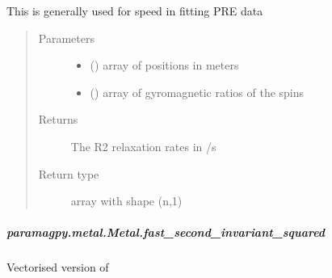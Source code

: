 \documentclass[a4paper,10pt,english,openany,oneside]{sphinxmanual}
\begin{document}
\begin{fulllineitems}
\begin{fulllineitems}
\begin{fulllineitems}
This is generally used for speed in fitting PRE data
\begin{quote}\begin{description}
\item[{Parameters}] \leavevmode\begin{itemize}
\item {} 
 (\sphinxstyleliteralemphasis{\sphinxupquote{ (}}\sphinxstyleliteralemphasis{\sphinxupquote{,}}\sphinxstyleliteralemphasis{\sphinxupquote{)}}) \textendash{} array of positions in meters

\item {} 
 (\sphinxstyleliteralemphasis{\sphinxupquote{ (}}\sphinxstyleliteralemphasis{\sphinxupquote{,}}\sphinxstyleliteralemphasis{\sphinxupquote{)}}) \textendash{} array of gyromagnetic ratios of the spins

\end{itemize}

\item[{Returns}] \leavevmode
{} \textendash{} The R2 relaxation rates in /s

\item[{Return type}] \leavevmode
array with shape (n,1)

\end{description}\end{quote}

\end{fulllineitems}



\subparagraph{paramagpy.metal.Metal.fast\_second\_invariant\_squared}
\label{\detokenize{reference/generated/paramagpy.metal.Metal.fast_second_invariant_squared:paramagpy-metal-metal-fast-second-invariant-squared}}\label{\detokenize{reference/generated/paramagpy.metal.Metal.fast_second_invariant_squared::doc}}

\begin{fulllineitems}
\label{\detokenize{reference/generated/paramagpy.metal.Metal.fast_second_invariant_squared:paramagpy.metal.Metal.fast_second_invariant_squared}}
Vectorised version of
{\hyperref[\detokenize{reference/generated/paramagpy.metal.Metal.second_invariant_squared:paramagpy.metal.Metal.second_invariant_squared}]{}}


\end{fulllineitems}
\end{fulllineitems}
\end{fulllineitems}
\end{document}
